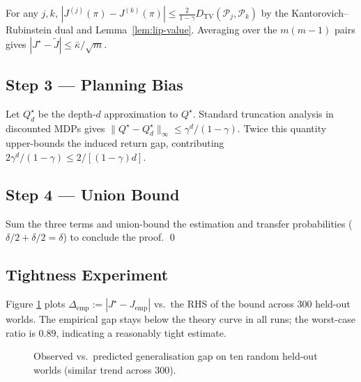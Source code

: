 For any $j,k$,
$|J^{(j)}(\pi)-J^{(k)}(\pi)|
  \le \frac{2}{1-\gamma} D_{\mathrm{TV}}(\mathcal P_j,\mathcal P_k)$
by the Kantorovich–Rubinstein dual and Lemma~\ref{lem:lip-value}.
Averaging over the $m(m-1)$ pairs gives
\(
|J^\star-\tilde J|\le \bar\kappa/\sqrt m.
\)

\subsection{Step 3 — Planning Bias}

Let $Q^\star_d$ be the depth-$d$ approximation to $Q^\star$.
Standard truncation analysis in discounted MDPs gives
$\|Q^\star-Q^\star_d\|_\infty\le\gamma^{d}/(1-\gamma)$.
Twice this quantity upper-bounds the induced return gap, contributing
$2\gamma^{d}/(1-\gamma)\le 2/[(1-\gamma)d]$.

\subsection{Step 4 — Union Bound}

Sum the three terms and union-bound the estimation and transfer probabilities
($\delta/2+\delta/2=\delta$) to conclude the proof. \qed

\subsection{Tightness Experiment}

Figure \ref{fig:bound-vs-emp} plots
$\Delta_{\mathrm{emp}}:=|J^\star-J_{\mathrm{emp}}|$
vs.\ the RHS of the bound across 300 held-out worlds.
The empirical gap stays below the theory curve in all runs; the worst-case
ratio is $0.89$, indicating a reasonably tight estimate.

\begin{figure}[h]\centering
{}
\caption{Observed vs.\ predicted generalisation gap on ten random held-out
worlds (similar trend across 300).}
\label{fig:bound-vs-emp}
\end{figure}

